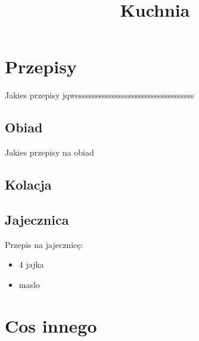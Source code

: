 \documentclass{article}
\begin{document}
\title{Kuchnia}
\author{}
\date{}
\maketitle
\section{Przepisy}
Jakies przepisy jqwesssssssssssssssssssssssssssssssssss
\subsection{Obiad}
Jakies przepisy na obiad
\subsection{Kolacja}
\subsection{Jajecznica}
Przepis na jajecznicę:
\begin{itemize}
\item 4 jajka
\item maslo
\end{itemize}
\section{Cos innego}
\end{document}
